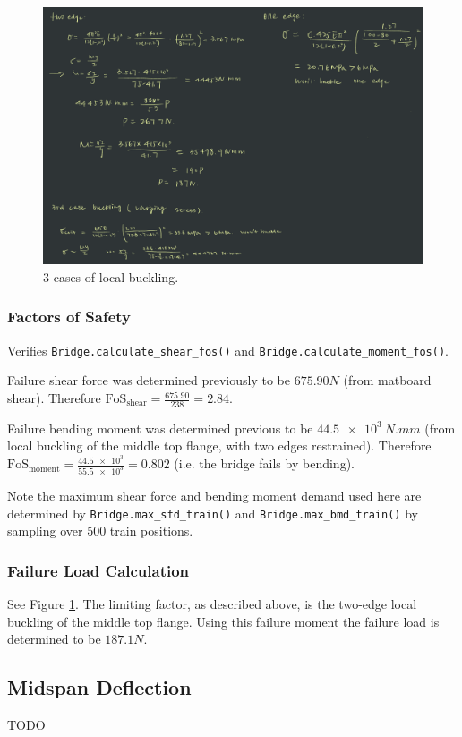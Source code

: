 \documentclass{article}
\begin{document}
\begin{figure}[H]
    \centering
    \includegraphics[width=\textwidth]{localbuckling.png}
    \caption{3 cases of local buckling.}
    \label{fig:local_buckling}
\end{figure}

\subsubsection{Factors of Safety}

Verifies \texttt{Bridge.calculate_shear_fos()} and \texttt{Bridge.calculate_moment_fos()}.

Failure shear force was determined previously to be \(675.90\si{N}\) (from matboard shear). Therefore
\(\text{FoS}_{\text{shear}} = \frac{675.90}{238} = 2.84\).

Failure bending moment was determined previous to be
\(\SI{44.5e3}{N.mm}\) (from local buckling of the middle top flange, with two edges restrained). Therefore
\(\text{FoS}_{\text{moment}} = \frac{\num{44.5e3}}{\num{55.5e3}} = 0.802\) (i.e. the bridge fails by bending).

Note the maximum shear force and bending moment demand used here are determined by
\texttt{Bridge.max_sfd_train()} and \texttt{Bridge.max_bmd_train()} by sampling over 500 train
positions.

\subsubsection{Failure Load Calculation}

See Figure \ref{fig:local_buckling}. The limiting factor, as described above, is the two-edge local buckling of the middle top
flange. Using this failure moment the failure load is determined to be \(187.1\si{N}\).

\subsection{Midspan Deflection}

{\color{red}TODO}
\end{document}
